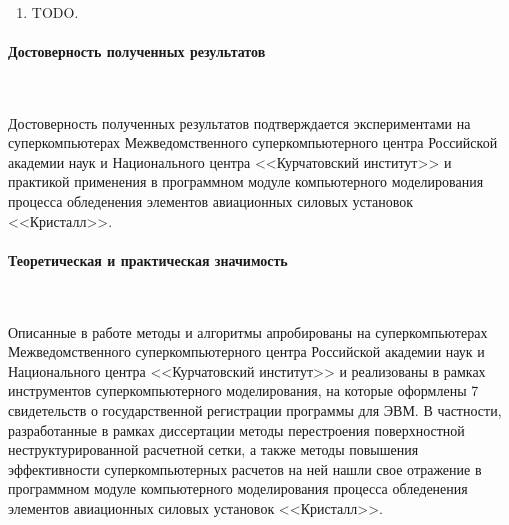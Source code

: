 \documentclass[a4paper,14pt]{extarticle}                     %
\theoremstyle{plain}                                         %
\begin{document}
\

\begin{enumerate}[noitemsep,topsep=0pt,parsep=0pt,partopsep=0pt]
\item TODO.
\end{enumerate}

\paragraph{Достоверность полученных результатов}

\

Достоверность полученных результатов подтверждается экспериментами на суперкомпьютерах Межведомственного суперкомпьютерного центра Российской академии наук и Национального центра <<Курчатовский институт>> и практикой применения в программном модуле компьютерного моделирования процесса обледенения элементов авиационных силовых установок <<Кристалл>>.

\paragraph{Теоретическая и практическая значимость}

\

Описанные в работе методы и алгоритмы апробированы на суперкомпьютерах Межведомственного суперкомпьютерного центра Российской академии наук и Национального центра <<Курчатовский институт>> и реализованы в рамках инструментов суперкомпьютерного моделирования, на которые оформлены 7 свидетельств о государственной регистрации программы для ЭВМ.
В частности, разработанные в рамках диссертации методы перестроения поверхностной неструктурированной расчетной сетки, а также методы повышения эффективности суперкомпьютерных расчетов на ней нашли свое отражение в программном модуле компьютерного моделирования процесса обледенения элементов авиационных силовых установок <<Кристалл>>.
\end{document}
